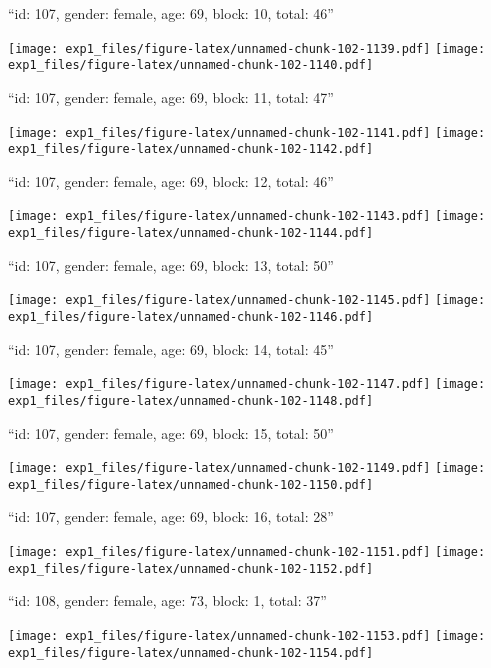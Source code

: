 \documentclass[11pt,,]{article}
\begin{document}
\newpage
[1] 

``id: 107, gender: female, age: 69, block: 10, total: 46''

\texttt{[image: exp1\_files/figure-latex/unnamed-chunk-102-1139.pdf]}
\texttt{[image: exp1\_files/figure-latex/unnamed-chunk-102-1140.pdf]}

\newpage
[1] 

``id: 107, gender: female, age: 69, block: 11, total: 47''

\texttt{[image: exp1\_files/figure-latex/unnamed-chunk-102-1141.pdf]}
\texttt{[image: exp1\_files/figure-latex/unnamed-chunk-102-1142.pdf]}

\newpage
[1] 

``id: 107, gender: female, age: 69, block: 12, total: 46''

\texttt{[image: exp1\_files/figure-latex/unnamed-chunk-102-1143.pdf]}
\texttt{[image: exp1\_files/figure-latex/unnamed-chunk-102-1144.pdf]}

\newpage
[1] 

``id: 107, gender: female, age: 69, block: 13, total: 50''

\texttt{[image: exp1\_files/figure-latex/unnamed-chunk-102-1145.pdf]}
\texttt{[image: exp1\_files/figure-latex/unnamed-chunk-102-1146.pdf]}

\newpage
[1] 

``id: 107, gender: female, age: 69, block: 14, total: 45''

\texttt{[image: exp1\_files/figure-latex/unnamed-chunk-102-1147.pdf]}
\texttt{[image: exp1\_files/figure-latex/unnamed-chunk-102-1148.pdf]}

\newpage
[1] 

``id: 107, gender: female, age: 69, block: 15, total: 50''

\texttt{[image: exp1\_files/figure-latex/unnamed-chunk-102-1149.pdf]}
\texttt{[image: exp1\_files/figure-latex/unnamed-chunk-102-1150.pdf]}

\newpage
[1] 

``id: 107, gender: female, age: 69, block: 16, total: 28''

\texttt{[image: exp1\_files/figure-latex/unnamed-chunk-102-1151.pdf]}
\texttt{[image: exp1\_files/figure-latex/unnamed-chunk-102-1152.pdf]}

\newpage
[1] 

``id: 108, gender: female, age: 73, block: 1, total: 37''

\texttt{[image: exp1\_files/figure-latex/unnamed-chunk-102-1153.pdf]}
\texttt{[image: exp1\_files/figure-latex/unnamed-chunk-102-1154.pdf]}
\end{document}
